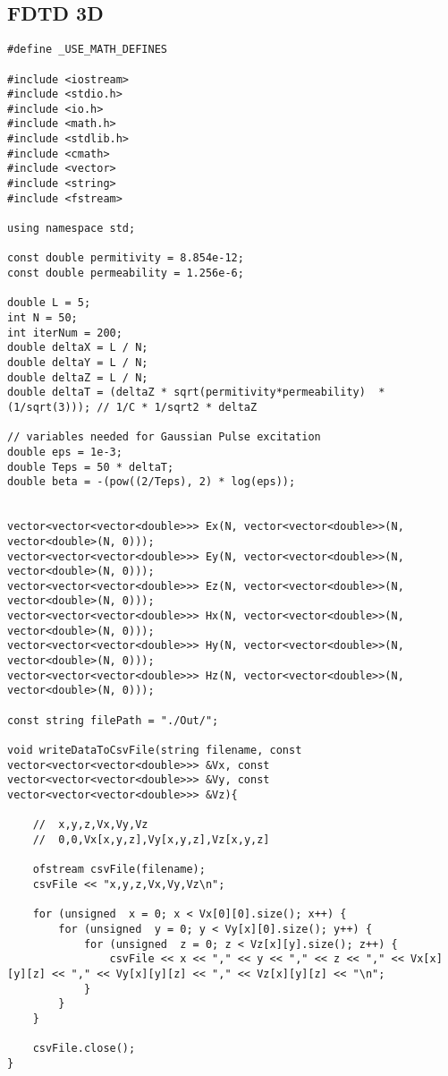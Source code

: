 \subsection{FDTD 3D}
\begin{verbatim}
#define _USE_MATH_DEFINES

#include <iostream>
#include <stdio.h>
#include <io.h>
#include <math.h>
#include <stdlib.h>
#include <cmath>
#include <vector>
#include <string>
#include <fstream>

using namespace std;

const double permitivity = 8.854e-12;
const double permeability = 1.256e-6;

double L = 5;
int N = 50;
int iterNum = 200;
double deltaX = L / N;
double deltaY = L / N;
double deltaZ = L / N;
double deltaT = (deltaZ * sqrt(permitivity*permeability)  * (1/sqrt(3))); // 1/C * 1/sqrt2 * deltaZ

// variables needed for Gaussian Pulse excitation
double eps = 1e-3;
double Teps = 50 * deltaT;
double beta = -(pow((2/Teps), 2) * log(eps));


vector<vector<vector<double>>> Ex(N, vector<vector<double>>(N, vector<double>(N, 0)));
vector<vector<vector<double>>> Ey(N, vector<vector<double>>(N, vector<double>(N, 0)));
vector<vector<vector<double>>> Ez(N, vector<vector<double>>(N, vector<double>(N, 0)));
vector<vector<vector<double>>> Hx(N, vector<vector<double>>(N, vector<double>(N, 0)));
vector<vector<vector<double>>> Hy(N, vector<vector<double>>(N, vector<double>(N, 0)));
vector<vector<vector<double>>> Hz(N, vector<vector<double>>(N, vector<double>(N, 0)));

const string filePath = "./Out/";

void writeDataToCsvFile(string filename, const vector<vector<vector<double>>> &Vx, const vector<vector<vector<double>>> &Vy, const vector<vector<vector<double>>> &Vz){
	
	//	x,y,z,Vx,Vy,Vz
	//	0,0,Vx[x,y,z],Vy[x,y,z],Vz[x,y,z]
	
	ofstream csvFile(filename);
	csvFile << "x,y,z,Vx,Vy,Vz\n";
	
	for (unsigned  x = 0; x < Vx[0][0].size(); x++) {
		for (unsigned  y = 0; y < Vy[x][0].size(); y++) {
			for (unsigned  z = 0; z < Vz[x][y].size(); z++) {
				csvFile << x << "," << y << "," << z << "," << Vx[x][y][z] << "," << Vy[x][y][z] << "," << Vz[x][y][z] << "\n";
			}
		}
	}
	
	csvFile.close();
}


\end{verbatim}
